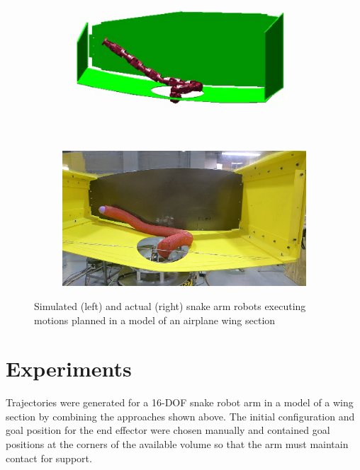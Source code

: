 \documentclass[../thesis.tex]{subfiles}
\begin{document}
\begin{figure}
  \centering
  \begin{subfigure}[b]{.48\linewidth}
    \includegraphics[width=\linewidth]{./Planning/simulated_snake_in_wing.png}
  \end{subfigure}
  \begin{subfigure}[b]{.48\linewidth}
    \includegraphics[width=\linewidth]{./Planning/real_snake_in_wing.png}
  \end{subfigure}
  
  \caption{Simulated (left) and actual (right) snake arm robots executing motions planned in a model of an airplane wing section}
  \label{fig:extend}
\end{figure}







\section{Experiments}
Trajectories were generated for a 16-DOF snake robot arm in a model of a wing section by combining the approaches shown above.
The initial configuration and goal position for the end effector were chosen manually and contained goal positions at the corners of the available volume so that the arm must maintain contact for support.
\end{document}
